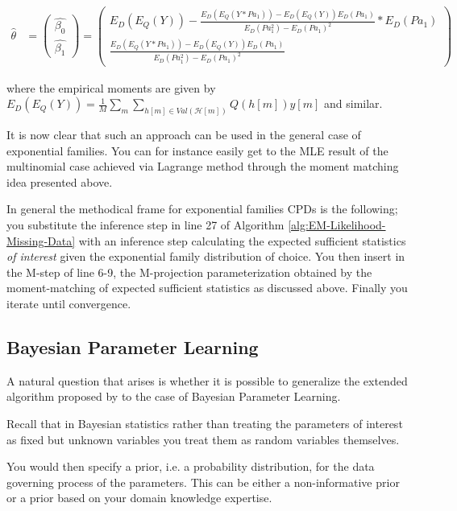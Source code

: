 \documentclass[11pt]{article}
\begin{document}
\begin{article}
 \begin{align}
 \hat{\theta} &= \begin{pmatrix}
                 \hat{\beta_0}\\
		 \hat{\beta_1}
           \end{pmatrix} 
        = \begin{pmatrix}
		 E_D(E_Q(Y)) - \frac{E_D(E_Q(Y*Pa_1))- E_D(E_Q(Y))E_D(Pa_1)}{E_D(Pa_1^2) - E_D(Pa_1)^2} * E_D(Pa_1)\\
		 \frac{E_D(E_Q(Y*Pa_1))- E_D(E_Q(Y))E_D(Pa_1)}{E_D(Pa_1^2) - E_D(Pa_1)^2}
           \end{pmatrix}
\end{align}

where the empirical moments are given by \(E_D(E_Q(Y)) = \frac{1}{M}
   \sum_m \sum_{h[m] \in Val(\mathscr{H}[m])} Q(h[m]) y[m]\) and
similar.    

It is now clear that such an approach can be used in the general
case of exponential families. You can for instance easily get to
the MLE result of the multinomial case achieved via Lagrange method
through the moment matching idea presented above.

In general the methodical frame for exponential families CPDs is
the following; you substitute the inference step in line 27 of
Algorithm \ref{alg:EM-Likelihood-Missing-Data} with an inference step
calculating the expected sufficient statistics \emph{of interest} given
the exponential family distribution of choice. You then insert in
the M-step of line 6-9, the M-projection parameterization obtained
by the moment-matching of expected sufficient statistics as
discussed above. Finally you iterate until convergence.

\subsection{Bayesian Parameter Learning}
\label{bayes-parameter-learning}
A natural question that arises is whether it is possible to
generalize the extended algorithm proposed by \cite{Mrad_2015} to the
case of Bayesian Parameter Learning.

Recall that in Bayesian statistics rather than treating the
parameters of interest as fixed but unknown variables you treat
them as random variables themselves.

You would then specify a prior, i.e. a probability distribution, for
the data governing process of the parameters. This can be either a
non-informative prior or a prior based on your domain knowledge
expertise.


\end{article}
\end{document}
